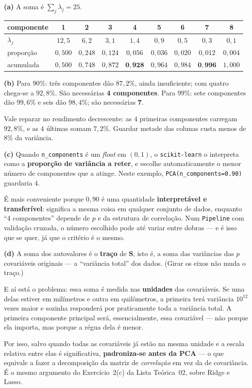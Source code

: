\documentclass[11pt,a4paper]{article}
\begin{document}
\begin{solucao}
\textbf{(a)} A soma é $\sum_j\lambda_j = 25$.
\begin{center}\small
\renewcommand{\arraystretch}{1.25}
\begin{tabular}{@{}lcccccccc@{}}
\toprule
componente & 1 & 2 & 3 & 4 & 5 & 6 & 7 & 8 \\
\midrule
$\lambda_j$        & $12{,}5$ & $6{,}2$ & $3{,}1$ & $1{,}4$ & $0{,}9$ & $0{,}5$ & $0{,}3$ & $0{,}1$ \\
proporção          & $0{,}500$ & $0{,}248$ & $0{,}124$ & $0{,}056$ & $0{,}036$ & $0{,}020$ & $0{,}012$ & $0{,}004$ \\
acumulada          & $0{,}500$ & $0{,}748$ & $0{,}872$ & $\mathbf{0{,}928}$ & $0{,}964$ & $0{,}984$ & $\mathbf{0{,}996}$ & $1{,}000$ \\
\bottomrule
\end{tabular}
\end{center}

\smallskip
\textbf{(b)} Para $90\%$: três componentes dão $87{,}2\%$, ainda insuficiente;
com quatro chega-se a $92{,}8\%$. São necessárias \textbf{4 componentes}. Para
$99\%$: sete componentes dão $99{,}6\%$ e seis dão $98{,}4\%$; são necessárias
\textbf{7}.

Vale reparar no rendimento decrescente: as $4$ primeiras componentes carregam
$92{,}8\%$, e as $4$ últimas somam $7{,}2\%$. Guardar metade das colunas custa
menos de $8\%$ da variância.

\smallskip
\textbf{(c)} Quando \texttt{n\_components} é um \emph{float} em $(0,1)$, o
\texttt{scikit-learn} o interpreta como a \textbf{proporção de variância a
reter}, e escolhe automaticamente o menor número de componentes que a atinge.
Neste exemplo, \texttt{PCA(n\_components=0.90)} guardaria $4$.

É mais conveniente porque $0{,}90$ é uma quantidade \textbf{interpretável e
transferível}: significa a mesma coisa em qualquer conjunto de dados, enquanto
``4 componentes'' depende de $p$ e da estrutura de correlação. Num
\texttt{Pipeline} com validação cruzada, o número escolhido pode até variar entre
dobras --- e é isso que se quer, já que o critério é o mesmo.

\smallskip
\textbf{(d)} A soma dos autovalores é o \textbf{traço} de $\bm S$, isto é, a soma
das variâncias das $p$ covariáveis originais --- a ``variância total'' dos dados.
(Girar os eixos não muda o traço.)

E aí está o problema: essa soma é medida nas \textbf{unidades} das covariáveis.
Se uma delas estiver em milímetros e outra em quilômetros, a primeira terá
variância $10^{12}$ vezes maior e sozinha responderá por praticamente toda a
variância total. A primeira componente principal será, essencialmente, essa
covariável --- não porque ela importa, mas porque a régua dela é menor.

Por isso, salvo quando todas as covariáveis já estão na mesma unidade e a escala
relativa entre elas é significativa, \textbf{padroniza-se antes da PCA} --- o que
equivale a fazer a decomposição da matriz de \emph{correlação} em vez da de
covariância. É o mesmo argumento do Exercício~2(c) da Lista Teórica~02, sobre
Ridge e Lasso.
\end{solucao}
\end{document}
